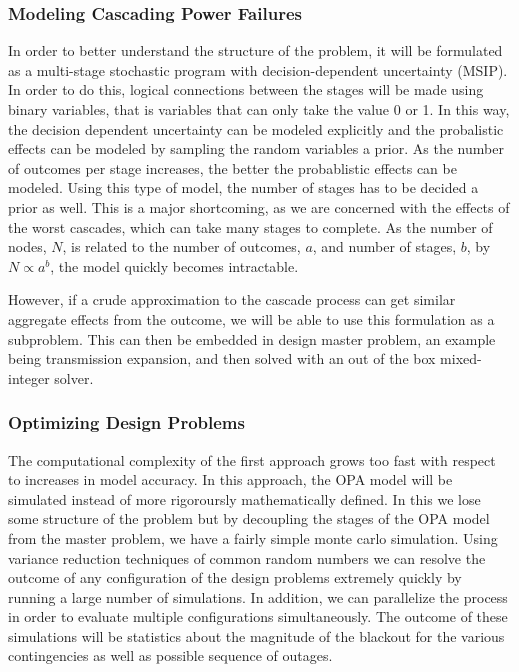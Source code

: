 \subsubsection{Modeling Cascading Power Failures}
In order to better understand the structure of the problem, it will be formulated as a multi-stage stochastic program with decision-dependent uncertainty (MSIP).  In order to do this, logical connections between the stages will be made using binary variables, that is variables that can only take the value 0 or 1.  In this way, the decision dependent uncertainty can be modeled explicitly and the probalistic effects can be modeled by sampling the random variables a prior.  As the number of outcomes per stage increases, the better the probablistic effects can be modeled.  Using this type of model, the number of stages has to be decided a prior as well.  This is a major shortcoming, as we are concerned with the effects of the worst cascades, which can take many stages to complete.  As the number of nodes, $N$, is related to the number of outcomes, $a$, and number of stages, $b$, by $N \propto a^{b}$, the model quickly becomes intractable. 

 However, if a crude approximation to the cascade process can get similar aggregate effects from the outcome, we will be able to use this formulation as a subproblem.  This can then be embedded in design master problem, an example being transmission expansion, and then solved with an out of the box mixed-integer solver.

\subsubsection{Optimizing Design Problems}
The computational complexity of the first approach grows too fast with respect to increases in model accuracy.  In this approach, the OPA model will be simulated instead of more rigoroursly mathematically defined.  In this we lose some structure of the problem but by decoupling the stages of the OPA model from the master problem, we have a fairly simple monte carlo simulation.  Using variance reduction techniques of common random numbers we can resolve the outcome of any configuration of the design problems extremely quickly by running a large number of simulations.  In addition, we can parallelize the process in order to evaluate multiple configurations simultaneously.  The outcome of these simulations will be statistics about the magnitude of the blackout for the various contingencies as well as possible sequence of outages.

